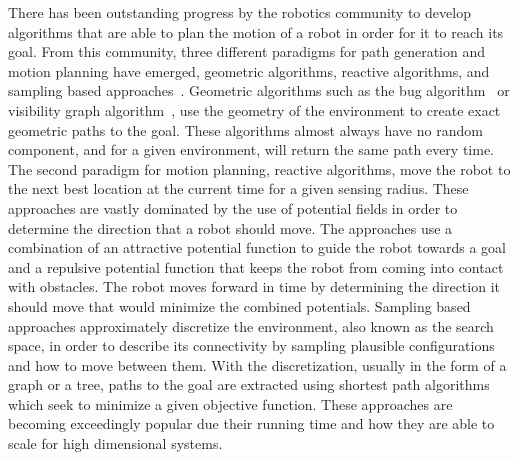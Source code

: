 There has been outstanding progress by the robotics community to develop
algorithms that are able to plan the motion of a robot in order for it to reach
its goal. From this community, three different paradigms for path generation
and motion planning have emerged, geometric algorithms, reactive algorithms,
and sampling based approaches~\cite{choset, lavalle}. Geometric algorithms such
as the bug algorithm~\cite{weir} or visibility graph algorithm~\cite{vis}, use
the geometry of the environment to create exact geometric paths to the goal.
These algorithms almost always have no random component, and for a given
environment, will return the same path every time. The second paradigm for
motion planning, reactive algorithms, move the robot to the next best location
at the current time for a given sensing radius. These approaches are vastly
dominated by the use of potential fields in order to determine the direction
that a robot should move. The approaches use a combination of an attractive
potential function to guide the robot towards a goal and a repulsive potential
function that keeps the robot from coming into contact with obstacles. The
robot moves forward in time by determining the direction it should move that
would minimize the combined potentials. Sampling based approaches approximately
discretize the environment, also known as the search space, in order to
describe its connectivity by sampling plausible configurations and how to move
between them.  With the discretization, usually in the form of a graph or a
tree, paths to the goal are extracted using shortest path algorithms which seek
to minimize a given objective function. These approaches are becoming
exceedingly popular due their running time and how they are able to scale for
high dimensional systems.

